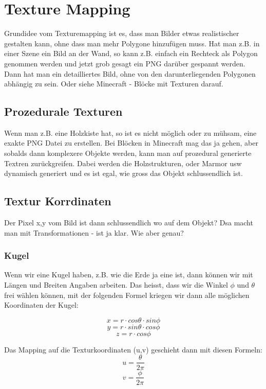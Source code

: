 \chapter{Texture Mapping}
Grundidee vom Texturemapping ist es, dass man Bilder etwas realistischer gestalten kann, ohne dass man mehr Polygone hinzufügen muss. Hat man z.B. in einer Szene ein Bild an der Wand, so kann z.B. einfach ein Rechteck als Polygon genommen werden und jetzt grob gesagt ein PNG darüber gespannt werden. Dann hat man ein detailliertes Bild, ohne von den darunterliegenden Polygonen abhängig zu sein. Oder siehe Minecraft - Blöcke mit Texturen darauf.

\section{Prozedurale Texturen}
Wenn man z.B. eine Holzkiste hat, so ist es nicht möglich oder zu mühsam, eine exakte PNG Datei zu erstellen. Bei Blöcken in Minecraft mag das ja gehen, aber sobalds dann komplexere Objekte werden, kann man auf prozedural generierte Textren zurückgreifen. Dabei werden die Holzstrukturen, oder Marmor usw dynamisch generiert und es ist egal, wie gross das Objekt schlussendlich ist.

\section{Textur Korrdinaten}
Der Pixel x,y vom Bild ist dann schlussendlich wo auf dem Objekt? Dsa macht man mit Transformationen - ist ja klar. Wie aber genau?
\subsection{Kugel}
Wenn wir eine Kugel haben, z.B. wie die Erde ja eine ist, dann können wir mit Längen und Breiten Angaben arbeiten. Das heisst, dass wir die Winkel \(\phi\) und \(\theta\) frei wählen können, mit der folgenden Formel kriegen wir dann alle möglichen Koordinaten der Kugel:

\begin{displaymath}
x = r\cdot cos \theta \cdot  sin \phi
\end{displaymath}
\begin{displaymath}
y = r\cdot sin \theta \cdot  cos \phi
\end{displaymath}
\begin{displaymath}
z = r\cdot cos\phi
\end{displaymath}

Das Mapping auf die Texturkoordinaten (u,v) geschieht dann mit diesen Formeln:
\begin{displaymath}
u = \frac{\theta}{2\pi}
\end{displaymath}
\begin{displaymath}
v = \frac{\phi}{2\pi}
\end{displaymath}
